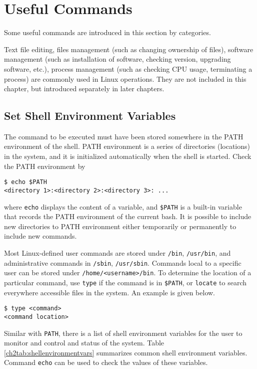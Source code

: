 \section{Useful Commands}

Some useful commands are introduced in this section by categories.

Text file editing, files management (such as changing ownership of files), software management (such as installation of software, checking version, upgrading software, etc.), process management (such as checking CPU usage, terminating a process) are commonly used in Linux operations. They are not included in this chapter, but introduced separately in later chapters.

\subsection{Set Shell Environment Variables}\label{ch2subsec:shellenvvar}

The command to be executed must have been stored somewhere in the PATH environment of the shell. PATH environment is a series of directories (locations) in the system, and it is initialized automatically when the shell is started. Check the PATH environment by
\begin{verbatim}
$ echo $PATH
<directory 1>:<directory 2>:<directory 3>: ...
\end{verbatim}
where \verb|echo| displays the content of a variable, and \verb|$PATH| is a built-in variable that records the PATH environment of the current bash. It is possible to include new directories to PATH environment either temporarily or permanently to include new commands.

Most Linux-defined user commands are stored under \verb|/bin|, \verb|/usr/bin|, and administrative commands in \verb|/sbin|, \verb|/usr/sbin|. Commands local to a specific user can be stored under \verb|/home/<username>/bin|. To determine the location of a particular command, use \verb|type| if the command is in \verb|$PATH|, or \verb|locate| to search everywhere accessible files in the system. An example is given below.
\begin{verbatim}
$ type <command>
<command location>
\end{verbatim}

Similar with \verb|PATH|, there is a list of shell environment variables for the user to monitor and control and status of the system. Table \ref{ch2tab:shellenvironmentvars} summarizes common shell environment variables. Command \verb|echo| can be used to check the values of these variables.


